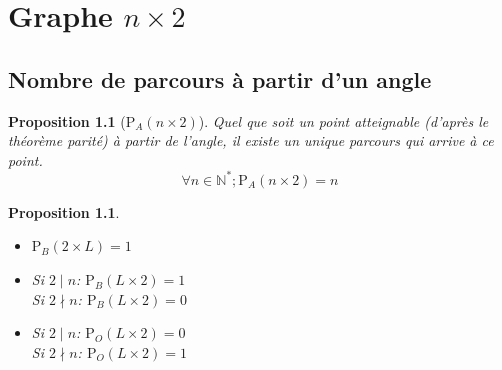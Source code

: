 \documentclass[twoside, a4paper, 12pt]{report}
\newtheorem{property}[theorem]{Proposition}
\newcommand{\pa}[2]{\ensuremath{\text{P}_A\left(#1 \times #2\right)}}
\newcommand{\pb}[2]{\ensuremath{\text{P}_B\left(#1 \times #2\right)}}
\newcommand{\po}[2]{\ensuremath{\text{P}_O\left(#1 \times #2\right)}}
\begin{document}
\chapter{Graphe $n \times 2$}

\section{Nombre de parcours à partir d'un angle}

\begin{property}[\pa{n}{2}]\label{pa_n_2}
Quel que soit un point atteignable (d'après le théorème parité) à partir de l'angle, il existe un unique parcours qui arrive à ce point.
\[\forall n \in \mathbb{N}^*; \pa{n}{2} = n\]
\end{property}

\begin{property}\label{pb_po_n_2}
\begin{itemize}
\item $\pb{2}{L} = 1$

\item 
Si $2 \mid n$:
$\pb{L}{2} = 1$ \\
Si $2 \nmid n$:
$\pb{L}{2} = 0$

\item
Si $2 \mid n$:
$\po{L}{2} = 0$ \\
Si $2 \nmid n$:
$\po{L}{2} = 1$
\end{itemize}
\end{property}
\end{document}
